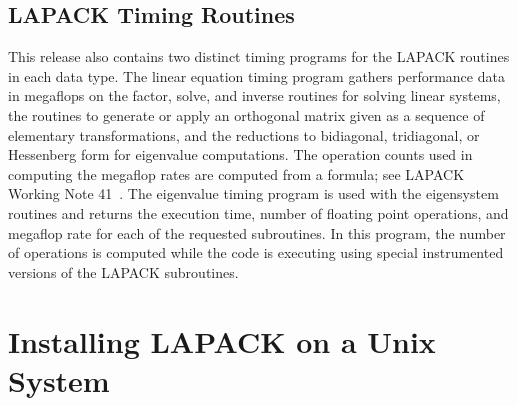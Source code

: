 \documentclass[11pt]{report}
\begin{document}
\subsection{LAPACK Timing Routines}

This release also contains two distinct timing programs for the
LAPACK routines in each data type. 
The linear equation timing program gathers performance data in
megaflops on the factor, solve, and inverse routines for solving
linear systems, the routines to generate or apply an orthogonal matrix
given as a sequence of elementary transformations, and the reductions
to bidiagonal, tridiagonal, or Hessenberg form for eigenvalue
computations.
The operation counts used in computing the megaflop rates are computed
from a formula;
see LAPACK Working Note 41~\cite{WN41}.
The eigenvalue timing program is used with the eigensystem routines
and returns the execution time, number of floating point operations, and
megaflop rate for each of the requested subroutines.
In this program, the number of operations is computed while the
code is executing using special instrumented versions of the LAPACK
subroutines.

\section{Installing LAPACK on a Unix System}\label{installation}
\end{document}
